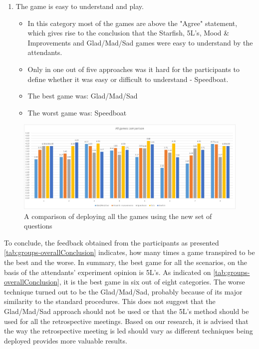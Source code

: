 \begin{enumerate}
\begin{itemize}
    \end{itemize}
    \item The game is easy to understand and play.
    \begin{itemize}
        \item In this category most of the games are above the "Agree" statement, which gives rise to the conclusion that the Starfish, 5L's, Mood \& Improvements and Glad/Mad/Sad games were easy to understand by the attendants.
        \item Only in one out of five approaches was it hard for the participants to define whether it was easy or difficult to understand - Speedboat.
        \item The best game was: Glad/Mad/Sad
        \item The worst game was: Speedboat
    \end{itemize}
\end{enumerate}

\begin{figure}[!htbp]
\caption{A comparison of deploying all the games using the new set of questions}
\label{fig:allGamesResultsNew}
\centering
\includegraphics[width=1.1\textwidth]{charts/allGamesComp}
\end{figure}

To conclude, the feedback obtained from the participants as presented \autoref{tab:groups-overallConclusion} indicates, how many times a game transpired to be the best and the worse. In summary, the best game  for all the scenarios, on the basis of the attendants’ experiment opinion is 5L's. As indicated on \autoref{tab:groups-overallConclusion}, it is the best game in six out of eight categories. The worse technique turned out to be the Glad/Mad/Sad, probably because of its major similarity to the standard procedures. This does not suggest that the Glad/Mad/Sad approach should not be used or that the 5L’s method should be used for all the retrospective meetings. Based on our research, it is advised that the way the retrospective meeting is led should vary as different techniques being deployed provides more valuable results.

